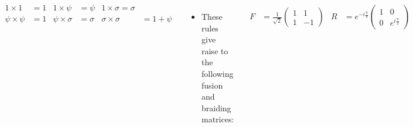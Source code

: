 \documentclass[20pt,,margin=1in,innermargin=-4.5in,blockverticalspace=-0.25in]{tikzposter}
\begin{document}
\begin{columns}
{\begin{itemize}
        \end{itemize}
        \begin{align*}
            1\times1&=1 & 1\times\psi&=\psi & 1\times\sigma=\sigma\\
            \psi\times\psi&=1 & \psi\times\sigma&=\sigma & \sigma\times\sigma&=1+\psi
        \end{align*}
        \begin{itemize}
            \item These rules give raise to the following fusion and braiding matrices:
        \end{itemize}
        \begin{align*}
            F&=\frac{1}{\sqrt{2}}
            \begin{pmatrix}
                1&1\\1&-1
            \end{pmatrix} & R&=e^{-i\frac{\pi}{8}}
            \begin{pmatrix}
                1&0\\0&e^{i\frac{\pi}{2}}
            \end{pmatrix}
        \end{align*}
        \begin{itemize}
            \item Unfortunately, no combination of $F$ and $R$ are dense in $SU(2)$ so Ising anyons cannot make a universal quantum computer. They can however, implement the Clifford group and so has some utility
        \end{itemize}
    }
    
\end{columns}
\end{document}
